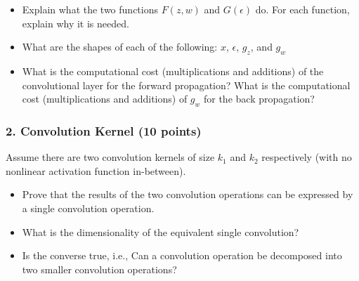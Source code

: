 \documentclass[12pt]{article}%
\begin{document}
\begin{itemize}
	\item Explain what the two functions $F(z, w)$ and $G(\epsilon)$ do.
    For each function, explain why it is needed.    
    \item What are the shapes of each of the following: $x$, $\epsilon$, $g_z$, and $g_w$
    \item What is the computational cost (multiplications and additions) of the convolutional
    layer for the forward propagation? What is the computational cost (multiplications and 
    additions) of $g_w$ for the back propagation?

\end{itemize}



\newpage


\subsubsection*{\textbf{2. Convolution Kernel (10 points)}}
Assume there are two convolution kernels of size 
$k_1$ and $k_2$ respectively (with no nonlinear activation function in-between).
\begin{itemize}
	\item Prove that the results of the two convolution operations can be expressed by a single convolution operation.
	\item What is the dimensionality of the equivalent single convolution?
 \item Is the converse true, i.e., 
 Can a convolution operation be decomposed into two smaller convolution operations?
\end{itemize}
\end{document}
